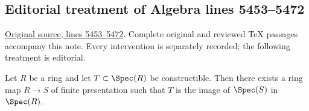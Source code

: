 \subsection{Editorial treatment of Algebra lines 5453--5472}

\hypertarget{algebra-context-035}{}

\noindent\href{https://github.com/stacks/stacks-project/blob/a04446e57ec1fbc252a871afcec7752fb2807b14/algebra.tex\#L5453}{Original source, lines 5453--5472}. Complete original and reviewed TeX passages accompany this note. Every intervention is separately recorded; the following treatment is editorial.


\begin{lemma}
\label{editorial-source-lemma-constructible-is-image}
Let $R$ be a ring and let $T \subset \Spec(R)$
be constructible. Then there exists a ring map $R \to S$ of
finite presentation such that $T$ is the image of
$\Spec(S)$ in $\Spec(R)$.
\end{lemma}

